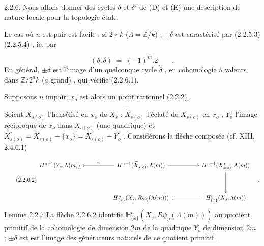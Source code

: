 2.2.6. Nous allons donner des cycles  $\delta$  et  $\delta'$  de  (D) et (E) une description de nature locale pour la topologie étale.

Le cas où  $n$  est pair est facile : si  $2 \nmid k$  ($\Lambda = \mathbb{Z}/k$)  ,  $\pm \delta$  est caractérisé par (2.2.5.3) (2.2.5.4) , ie. par

\begin{equation}\tag{2.2.6.1}
(\delta,\delta) \;=\; (-1)^{m}.2 \qquad .
\end{equation}
En général,  $\pm \delta$  est l'image d'un quelconque cycle  $\widetilde{\delta}$ , en cohomologie à valeurs dans  $\mathbb{Z}/2^{a}k$  ($a$  grand) , qui vérifie (2.2.6.1).

Supposons  $n$  impair; $x_o$  est alors un point rationnel (2.2.2).

Soient  $X_{s(o)}$  l'hensélisé en  $x_o$  de  $X_s$ ,  $\widetilde{X}_{s(o)}$  l'éclaté de  $X_{s(o)}$  en  $x_o$ ,  $Y_o$  l'image réciproque de  $x_o$  dans  $X_{s(o)}$  (une quadrique) et  $X^{*}_{s(o)} = X_{s(o)} - \{x_o\} = \widetilde{X}_{s(o)} - Y_o$ . Considérons la flèche composée  (cf. XIII, 2.4.6.1)

\begin{equation}\tag{2.2.6.2}
\begin{tikzcd}[column sep=huge, row sep=huge]
H^{n-1}(Y_o,\Lambda(m)) & H^{n-1}(\widetilde{X}_{s(o)},\Lambda(m)) \arrow[l,"\sim"'] \arrow[r] & H^{n-1}(X^{*}_{s(o)},\Lambda(m)) \arrow[d] \\
{} & H^{n}_{\{x\}}(X_s,R\psi_{\bar{\eta}}(\Lambda(m))) & H^{n}_{\{x\}}(X_s,\Lambda(m)) \arrow[l]
\end{tikzcd}\quad .
\end{equation}
\underline{Lemme} 2.2.7  \underline{La flèche 2.2.6.2 identifie}  $\mathbb{H}^{n}_{\{x\}}(X_s,R\psi_{\bar{\eta}}(\Lambda(m)))$  \underline{au quotient primitif de la cohomologie de dimension}  $2m$  \underline{de la quadrique}  $Y_o$  \underline{de dimension}  $2m$  ;  $\pm \delta$  \underline{est}
\underline{est l'image des générateurs naturels de ce quotient primitif.}

